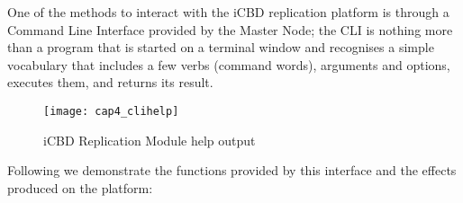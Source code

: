 
One of the methods to interact with the iCBD replication platform is through a Command Line Interface provided by the Master Node; the CLI is nothing more than a program that is started on a terminal window and recognises a simple vocabulary that includes a few verbs (command words), arguments and options, executes them, and returns its result.

\begin{figure}[htbp]
	\centering
	\texttt{[image: cap4\_clihelp]}
	\caption{iCBD Replication Module help output}
	\label{fig:icbd_rep_clihelp}
\end{figure}


Following we demonstrate the functions provided by this interface and the effects produced on the platform:

